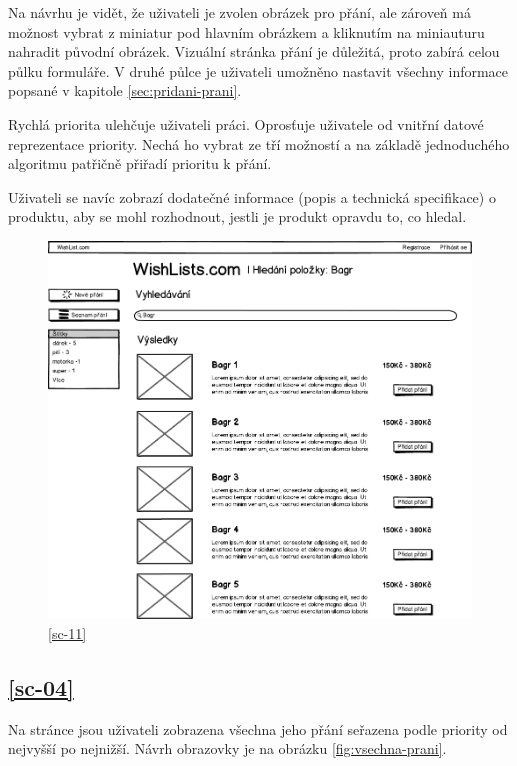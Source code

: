 Na návrhu je vidět, že uživateli je zvolen obrázek pro přání, ale zároveň má možnost vybrat z miniatur pod hlavním obrázkem a kliknutím na miniauturu nahradit původní obrázek. Vizuální stránka přání je důležitá, proto zabírá celou půlku formuláře. V druhé půlce je uživateli umožněno nastavit všechny informace popsané v kapitole \ref{sec:pridani-prani}.

Rychlá priorita ulehčuje uživateli práci. Oprosťuje uživatele od vnitřní datové reprezentace priority. Nechá ho vybrat ze tří možností a na základě jednoduchého algoritmu patřičně přiřadí prioritu k přání.

Uživateli se navíc zobrazí dodatečné informace (popis a technická specifikace) o produktu, aby se mohl rozhodnout, jestli je produkt opravdu to, co hledal.

\begin{figure}[htb]
\begin{center}
\includegraphics[width=130mm]{./pictures/mock/vysledky-hledani.png}
\caption{\ref{sc-11}}
\label{fig:formular-pridani-prani}
\end{center}
\end{figure}

\subsection{\ref{sc-04}}
Na stránce jsou uživateli zobrazena všechna jeho přání seřazena podle priority od nejvyšší po nejnižší. Návrh obrazovky je na obrázku \ref{fig:vsechna-prani}.

